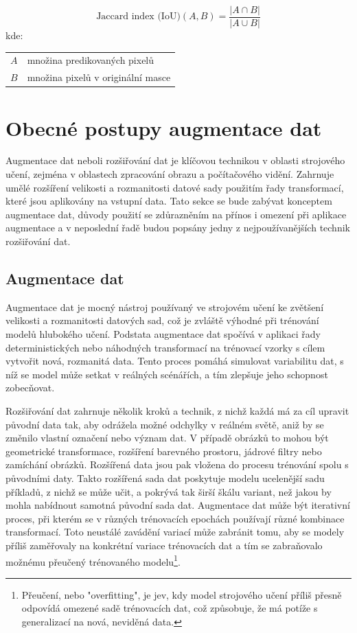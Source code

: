 \documentclass[male,czech,api_ing]{thesis}
\makeatletter
\newenvironment{conditions}[1][kde:]
    {#1 \begin{tabular}[t]{>{$}l<{$} @{${}={}$} >{\raggedright\arraybackslash}p{10cm}}}
    {\end{tabular}}
\makeatother
\begin{document}
\begin{equation}
    \text{Jaccard index (IoU)}(A, B) = \frac{|A \cap B|}{|A \cup B|}
\end{equation}
\begin{conditions}
    A & množina predikovaných pixelů \\
    B & množina pixelů v originální masce \\
\end{conditions}

\section{Obecné postupy augmentace dat}
Augmentace dat neboli rozšiřování dat je klíčovou technikou v oblasti strojového učení, zejména v oblastech zpracování obrazu a počítačového vidění. Zahrnuje umělé rozšíření velikosti a rozmanitosti datové sady použitím řady transformací, které jsou aplikovány na vstupní data. Tato sekce se bude zabývat konceptem augmentace dat, důvody použití se zdůrazněním na přínos i omezení při aplikace augmentace a v neposlední řadě budou popsány jedny z nejpoužívanějších technik rozšiřování dat.

\subsection{Augmentace dat}
Augmentace dat je mocný nástroj používaný ve strojovém učení ke zvětšení velikosti a rozmanitosti datových sad, což je zvláště výhodné při trénování modelů hlubokého učení. Podstata augmentace dat spočívá v aplikaci řady deterministických nebo náhodných transformací na trénovací vzorky s cílem vytvořit nová, rozmanitá data. Tento proces pomáhá simulovat variabilitu dat, s níž se model může setkat v reálných scénářích, a tím zlepšuje jeho schopnost zobecňovat.

Rozšiřování dat zahrnuje několik kroků a technik, z nichž každá má za cíl upravit původní data tak, aby odrážela možné odchylky v reálném světě, aniž by se změnilo vlastní označení nebo význam dat. V případě obrázků to mohou být geometrické transformace, rozšíření barevného prostoru, jádrové filtry nebo zamíchání obrázků. Rozšířená data jsou pak vložena do procesu trénování spolu s původními daty. Takto rozšířená sada dat poskytuje modelu ucelenější sadu příkladů, z nichž se může učit, a pokrývá tak širší škálu variant, než jakou by mohla nabídnout samotná původní sada dat. Augmentace dat může být iterativní proces, při kterém se v různých trénovacích epochách používají různé kombinace transformací. Toto neustálé zavádění variací může zabránit tomu, aby se modely příliš zaměřovaly na konkrétní variace trénovacích dat a tím se zabraňovalo možnému přeučený trénovaného modelu\footnote{Přeučení, nebo "overfitting", je jev, kdy model strojového učení příliš přesně odpovídá omezené sadě trénovacích dat, což způsobuje, že má potíže s generalizací na nová, neviděná data.}. \cite{AugmentationBasics, AugmentationSurvey}
\end{document}
